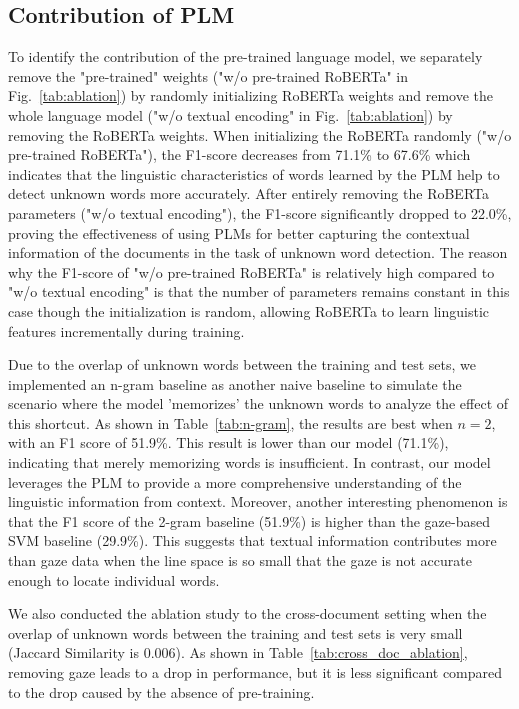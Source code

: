 \subsection{Contribution of PLM}
\label{sec:contribution_PLM}

To identify the contribution of the pre-trained language model, we separately remove the "pre-trained" weights ("w/o pre-trained RoBERTa" in Fig.~\ref{tab:ablation}) by randomly initializing RoBERTa weights and remove the whole language model ("w/o textual encoding" in Fig.~\ref{tab:ablation}) by removing the RoBERTa weights. When initializing the RoBERTa randomly ("w/o pre-trained RoBERTa"), the F1-score decreases from 71.1\% to 67.6\% which indicates that the linguistic characteristics of words learned by the PLM help \name{} to detect unknown words more accurately. After entirely removing the RoBERTa parameters ("w/o textual encoding"), the F1-score significantly dropped to 22.0\%, proving the effectiveness of using PLMs for better capturing the contextual information of the documents in the task of unknown word detection. The reason why the F1-score of "w/o pre-trained RoBERTa" is relatively high compared to "w/o textual encoding" is that the number of parameters remains constant in this case though the initialization is random, allowing RoBERTa to learn linguistic features incrementally during training.

Due to the overlap of unknown words between the training and test sets, we implemented an n-gram baseline as another naive baseline to simulate the scenario where the model 'memorizes' the unknown words to analyze the effect of this shortcut. As shown in Table~\ref{tab:n-gram}, the results are best when $n=2$, with an F1 score of 51.9\%. This result is lower than our model (71.1\%), indicating that merely memorizing words is insufficient. In contrast, our model leverages the PLM to provide a more comprehensive understanding of the linguistic information from context. Moreover, another interesting phenomenon is that the F1 score of the 2-gram baseline (51.9\%) is higher than the gaze-based SVM baseline (29.9\%). This suggests that textual information contributes more than gaze data when the line space is so small that the gaze is not accurate enough to locate individual words.



We also conducted the ablation study to the cross-document setting when the overlap of unknown words between the training and test sets is very small (Jaccard Similarity is 0.006). As shown in Table~\ref{tab:cross_doc_ablation}, removing gaze leads to a drop in performance, but it is less significant compared to the drop caused by the absence of pre-training.

